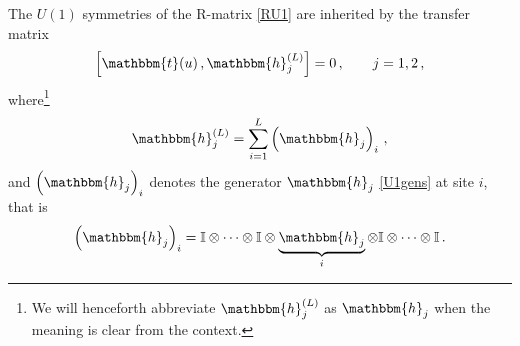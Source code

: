 \documentclass[12pt]{article}
\numberwithin{equation}{section}
\newcommand{\id}{\mathbb{I}}
\begin{document}
	The $U(1)$ symmetries of the R-matrix \eqref{RU1}
	are inherited by the transfer matrix
	\begin{equation}
		\left[ \mathbbm{t}(u)\,, \mathbbm{h}_j^{(L)} \right] = 0 \,, \qquad j = 1, 2 \,,
		\label{U1transf}
	\end{equation}
	where\footnote{We will henceforth abbreviate $\mathbbm{h}_j^{(L)}$ as $\mathbbm{h}_j$ when the meaning is clear from the context.} 
	\begin{equation}
		\mathbbm{h}_j^{(L)} = \sum_{i=1}^L \left( \mathbbm{h}_j \right)_i \,,
	\end{equation}
	and $\left( \mathbbm{h}_j \right)_i$ denotes the generator $\mathbbm{h}_j$ \eqref{U1gens} at site $i$, that is
	\begin{equation}
		\left( \mathbbm{h}_j \right)_i = \id \otimes  \cdots \otimes \id \otimes \underbrace{\mathbbm{h}_j}_{i} \otimes \id \otimes \cdots \otimes\id \,.
	\end{equation}
	
\end{document}

